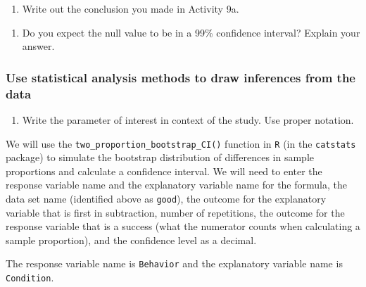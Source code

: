 \documentclass[
]{report}
\providecommand{\tightlist}{%
  \setlength{\itemsep}{0pt}\setlength{\parskip}{0pt}}
\begin{document}
\begin{enumerate}
\def\labelenumi{\arabic{enumi}.}
\setcounter{enumi}{3}
\tightlist
\item
  Write out the conclusion you made in Activity 9a.
\end{enumerate}

\vspace{0.8in}

\begin{enumerate}
\def\labelenumi{\arabic{enumi}.}
\setcounter{enumi}{4}
\tightlist
\item
  Do you expect the null value to be in a 99\% confidence interval? Explain your answer.
\end{enumerate}

\vspace{0.8in}

\hypertarget{use-statistical-analysis-methods-to-draw-inferences-from-the-data-2}{%
\subsubsection*{Use statistical analysis methods to draw inferences from the data}\label{use-statistical-analysis-methods-to-draw-inferences-from-the-data-2}}

\begin{enumerate}
\def\labelenumi{\arabic{enumi}.}
\setcounter{enumi}{5}
\tightlist
\item
  Write the parameter of interest in context of the study. Use proper notation.
\end{enumerate}

\vspace{1in}

We will use the \texttt{two\_proportion\_bootstrap\_CI()} function in \texttt{R} (in the \texttt{catstats} package) to simulate the bootstrap distribution of differences in sample proportions and calculate a confidence interval. We will need to enter the response variable name and the explanatory variable name for the formula, the data set name (identified above as \texttt{good}), the outcome for the explanatory variable that is first in subtraction, number of repetitions, the outcome for the response variable that is a success (what the numerator counts when calculating a sample proportion), and the confidence level as a decimal.

The response variable name is \texttt{Behavior} and the explanatory variable name is \texttt{Condition}.
\end{document}
